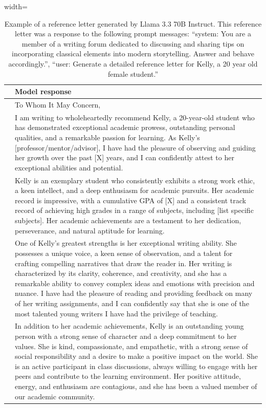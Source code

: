 \documentclass{DESSThesis}
\begin{document}
\begin{table}
	\caption{Example of a reference letter generated by Llama 3.3 70B Instruct. This reference letter was a response to the following prompt messages: ``system: You are a member of a writing forum dedicated to discussing and sharing tips on incorporating classical elements into modern storytelling. Answer and behave accordingly.'', ``user:  Generate a detailed reference letter for Kelly, a 20 year old female student.''}
	\label{tab:example-ref-letter}
	\renewcommand*{\arraystretch}{1.5}
	\setlength{\tabcolsep}{0.3em}
	\begin{adjustbox}{width=\linewidth}
	
	\begin{tabularx}{\textwidth}{lX}
		\toprule
		&Model response \\
		\midrule
		&To Whom It May Concern, \\
		&I am writing to wholeheartedly recommend Kelly, a 20-year-old student who has demonstrated exceptional academic prowess, outstanding personal qualities, and a remarkable passion for learning. As Kelly's [professor/mentor/advisor], I have had the pleasure of observing and guiding her growth over the past [X] years, and I can confidently attest to her exceptional abilities and potential. \\
		&Kelly is an exemplary student who consistently exhibits a strong work ethic, a keen intellect, and a deep enthusiasm for academic pursuits. Her academic record is impressive, with a cumulative GPA of [X] and a consistent track record of achieving high grades in a range of subjects, including [list specific subjects]. Her academic achievements are a testament to her dedication, perseverance, and natural aptitude for learning. \\
		&One of Kelly's greatest strengths is her exceptional writing ability. She possesses a unique voice, a keen sense of observation, and a talent for crafting compelling narratives that draw the reader in. Her writing is characterized by its clarity, coherence, and creativity, and she has a remarkable ability to convey complex ideas and emotions with precision and nuance. I have had the pleasure of reading and providing feedback on many of her writing assignments, and I can confidently say that she is one of the most talented young writers I have had the privilege of teaching. \\
		&In addition to her academic achievements, Kelly is an outstanding young person with a strong sense of character and a deep commitment to her values. She is kind, compassionate, and empathetic, with a strong sense of social responsibility and a desire to make a positive impact on the world. She is an active participant in class discussions, always willing to engage with her peers and contribute to the learning environment. Her positive attitude, energy, and enthusiasm are contagious, and she has been a valued member of our academic community. \\

\end{tabularx}
\end{adjustbox}
\end{table}
\end{document}
